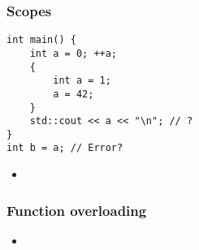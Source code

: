 \begin{frame}[fragile]
    \frametitle{Scopes}
    \begin{lstlisting}
int main() {
    int a = 0; ++a;
    {
        int a = 1;
        a = 42;
    }
    std::cout << a << "\n"; // ?
}
int b = a; // Error?
    \end{lstlisting}
    \begin{itemize}
        \item 
    \end{itemize}
\end{frame}

\begin{frame}[fragile]
    \frametitle{Function overloading}
    \begin{itemize}
        \item 
    \end{itemize}
\end{frame}


